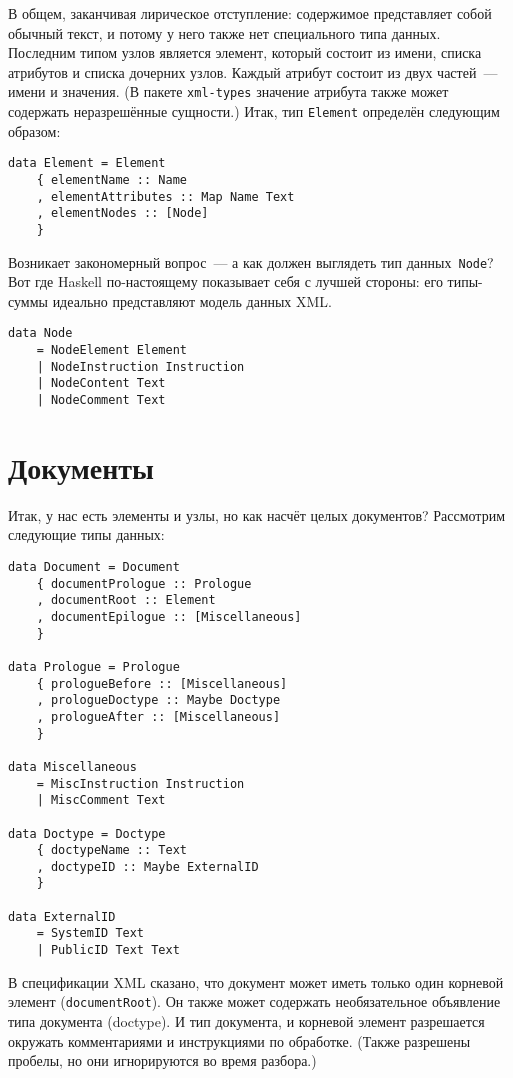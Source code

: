 В общем, заканчивая лирическое отступление: содержимое представляет собой обычный текст, и потому у него также нет специального типа данных. Последним типом узлов является элемент, который состоит из имени, списка атрибутов и списка дочерних узлов. Каждый атрибут состоит из двух частей~--- имени и значения. (В пакете \lstinline!xml-types! значение атрибута также может содержать неразрешённые сущности.) Итак, тип \lstinline!Element! определён следующим образом:
\begin{lstlisting}
data Element = Element
    { elementName :: Name
    , elementAttributes :: Map Name Text
    , elementNodes :: [Node]
    }
\end{lstlisting}

Возникает закономерный вопрос~--- а как должен выглядеть тип данных~\lstinline!Node!? Вот где Haskell по-настоящему показывает себя с лучшей стороны: его типы-суммы идеально представляют модель данных XML.

\begin{lstlisting}
data Node
    = NodeElement Element
    | NodeInstruction Instruction
    | NodeContent Text
    | NodeComment Text
\end{lstlisting}

\section{Документы}
Итак, у нас есть элементы и узлы, но как насчёт целых документов? Рассмотрим следующие типы данных:
\begin{lstlisting}
data Document = Document
    { documentPrologue :: Prologue
    , documentRoot :: Element
    , documentEpilogue :: [Miscellaneous]
    }

data Prologue = Prologue
    { prologueBefore :: [Miscellaneous]
    , prologueDoctype :: Maybe Doctype
    , prologueAfter :: [Miscellaneous]
    }

data Miscellaneous
    = MiscInstruction Instruction
    | MiscComment Text

data Doctype = Doctype
    { doctypeName :: Text
    , doctypeID :: Maybe ExternalID
    }

data ExternalID
    = SystemID Text
    | PublicID Text Text
\end{lstlisting}

В спецификации XML сказано, что документ может иметь только один корневой элемент (\lstinline!documentRoot!). Он также может содержать необязательное объявление типа документа (doctype). И тип документа, и корневой элемент разрешается окружать комментариями и инструкциями по обработке. (Также разрешены пробелы, но они игнорируются во время разбора.)

